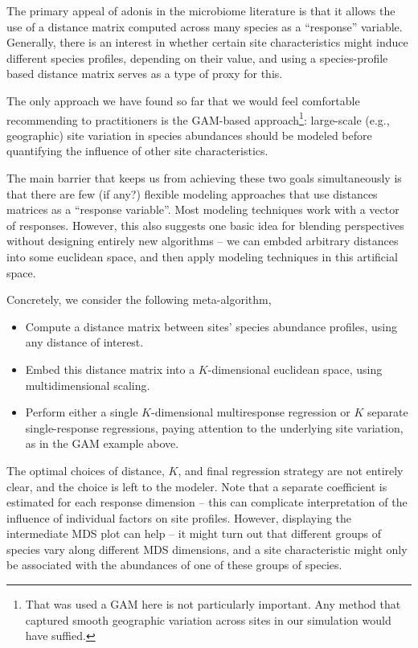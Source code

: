 \documentclass{article}
\begin{document}
The primary appeal of adonis in the microbiome literature is that it allows the
use of a distance matrix computed across many species as a ``response''
variable. Generally, there is an interest in whether certain site
characteristics might induce different species profiles, depending on their
value, and using a species-profile based distance matrix serves as a type of
proxy for this.

The only approach we have found so far that we would feel comfortable
recommending to practitioners is the GAM-based approach\footnote{That was used a
  GAM here is not particularly important. Any method that captured smooth
  geographic variation across sites in our simulation would have suffied.}:
large-scale (e.g., geographic) site variation in species abundances should be
modeled before quantifying the influence of other site characteristics.

The main barrier that keeps us from achieving these two goals simultaneously is
that there are few (if any?) flexible modeling approaches that use distances
matrices as a ``response variable''. Most modeling techniques work with a vector
of responses. However, this also suggests one basic idea for blending
perspectives without designing entirely new algorithms -- we can embded
arbitrary distances into some euclidean space, and then apply modeling
techniques in this artificial space.

Concretely, we consider the following meta-algorithm,

\begin{itemize}
\item Compute a distance matrix between sites' species abundance profiles, using
  any distance of interest.
\item Embed this distance matrix into a $K$-dimensional euclidean space, using
  multidimensional scaling. 
\item Perform either a single $K$-dimensional multiresponse regression or $K$
  separate single-response regressions, paying attention to the underlying site
  variation, as in the GAM example above.
\end{itemize}

The optimal choices of distance, $K$, and final regression strategy are not
entirely clear, and the choice is left to the modeler. Note that a separate
coefficient is estimated for each response dimension -- this can complicate
interpretation of the influence of individual factors on site profiles. However,
displaying the intermediate MDS plot can help -- it might turn out that
different groups of species vary along different MDS dimensions, and a site
characteristic might only be associated with the abundances of one of these
groups of species.
\end{document}
